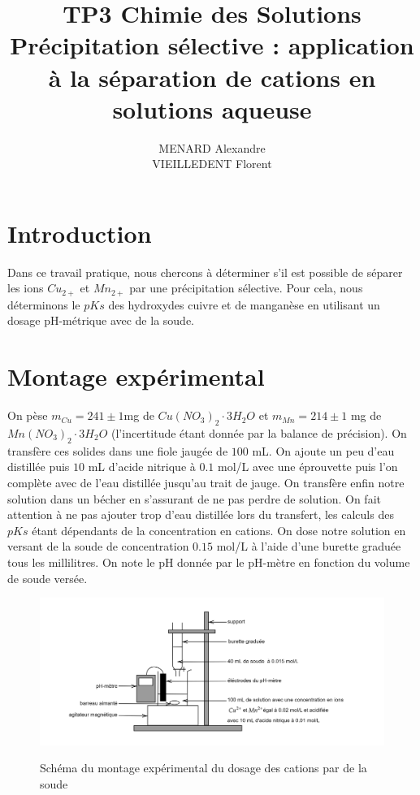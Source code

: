 \documentclass[12pt]{article}
\title{\textbf{TP3 Chimie des Solutions} \\ Précipitation sélective : application à la séparation de cations en solutions aqueuse}
\author{MENARD Alexandre \\ VIEILLEDENT Florent}
\begin{document}
\maketitle

\section*{Introduction}
Dans ce travail pratique, nous chercons à déterminer s'il est possible de séparer les ions $Cu_{2+}$ et $Mn_{2+}$ par une précipitation sélective. Pour cela, nous déterminons le $pKs$ des hydroxydes cuivre et de manganèse en utilisant un dosage pH-métrique avec de la soude.
\newpage

\section{Montage expérimental}

On pèse $m_{Cu} = 241 \pm 1$mg de $Cu(NO_3)_2 \cdot 3 H_2O$ et $m_{Mn}= 214 \pm 1$ mg de $Mn(NO_3)_2\cdot 3 H_2O$ (l'incertitude étant donnée par la balance de précision). On transfère ces solides dans une fiole jaugée de $100 $ mL. On ajoute un peu d'eau distillée puis $10$ mL d'acide nitrique à $0.1 $ mol/L avec une éprouvette puis l'on complète avec de l'eau distillée jusqu'au trait de jauge. On transfère enfin notre solution dans un bécher en s'assurant de ne pas perdre de solution. On fait attention à ne pas ajouter trop d'eau distillée lors du transfert, les calculs des $pKs$ étant dépendants de la concentration en cations. On dose notre solution en versant de la soude de concentration $0.15$ mol/L à l'aide d'une burette graduée tous les millilitres. On note le pH donnée par le pH-mètre en fonction du volume de soude versée.

\begin{figure}[h!]
	\begin{center}
		\includegraphics[scale=0.2]{Schema_dosage.png}
		\label{img:Schema_dosage}
		\caption{Schéma du montage expérimental du dosage des cations par de la soude}
	\end{center}
\end{figure}
\end{document}
